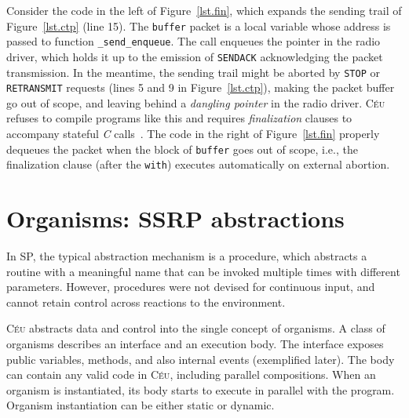 \documentclass{sigplanconf}
\newcommand{\CEU}{\textsc{C\'{e}u}\xspace}
\newcommand{\code}[1] {{\small{\texttt{#1}}}}
\newcommand{\1}{\;}
\newcommand{\2}{\;\;}
\newcommand{\3}{\;\;\;}
\newcommand{\5}{\;\;\;\;\;}
\begin{document}
Consider the code in the left of Figure~\ref{lst.fin}, which expands the 
sending trail of Figure~\ref{lst.ctp} (line 15).
%
The \code{buffer} packet is a local variable whose address is passed to 
function \code{\_send\_enqueue}.
The call enqueues the pointer in the radio driver, which holds it up to the 
emission of \code{SENDACK} acknowledging the packet transmission.
%
In the meantime, the sending trail might be aborted by \code{STOP} or 
\code{RETRANSMIT} requests (lines 5 and 9 in Figure~\ref{lst.ctp}), making the 
packet buffer go out of scope, and leaving behind a \emph{dangling pointer} in 
the radio driver.
%
\CEU refuses to compile programs like this and requires \emph{finalization} 
clauses to accompany stateful \emph{C} calls~\cite{ceu.sensys13}.
The code in the right of Figure~\ref{lst.fin} properly dequeues the packet when
the block of \code{buffer} goes out of scope, i.e., the finalization clause 
(after the \code{with}) executes automatically on external abortion.

\section{Organisms: SSRP abstractions}
\label{sec.orgs}


%
In SP, the typical abstraction mechanism is a procedure, which abstracts a 
routine with a meaningful name that can be invoked multiple times with 
different parameters.
%
However, procedures were not devised for continuous input, and cannot retain 
control across reactions to the environment.
%

\CEU abstracts data and control into the single concept of organisms.
%
A class of organisms describes an interface and an execution body.
The interface exposes public variables, methods, and also internal events 
(exemplified later).
The body can contain any valid code in \CEU, including parallel compositions.
When an organism is instantiated, its body starts to execute in parallel with 
the program.
Organism instantiation can be either static or dynamic.
\end{document}
